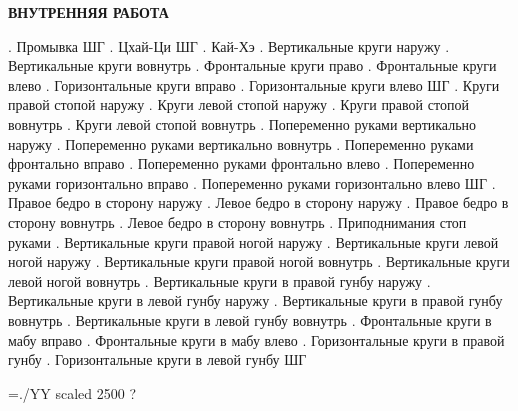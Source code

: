 \nopagenumbers
\centerline{\bf ВНУТРЕННЯЯ РАБОТА}
\obeylines
\leavevmode{}. Промывка
ШГ
\leavevmode{}. Цхай-Ци
ШГ
\leavevmode{}. Кай-Хэ
\leavevmode{}. Вертикальные круги наружу
\leavevmode{}. Вертикальные круги вовнутрь
\leavevmode{}. Фронтальные круги право
\leavevmode{}. Фронтальные круги влево
\leavevmode{}. Горизонтальные круги вправо
\leavevmode{}. Горизонтальные круги влево
ШГ
\leavevmode{}. Круги правой стопой наружу
\leavevmode{}. Круги левой стопой наружу
\leavevmode{}. Круги правой стопой вовнутрь
\leavevmode{}. Круги левой стопой вовнутрь
\leavevmode{}. Попеременно руками вертикально наружу
\leavevmode{}. Попеременно руками вертикально вовнутрь
\leavevmode{}. Попеременно руками фронтально вправо
\leavevmode{}. Попеременно руками фронтально влево
\leavevmode{}. Попеременно руками горизонтально вправо
\leavevmode{}. Попеременно руками горизонтально влево
ШГ
\leavevmode{}. Правое бедро в сторону наружу
\leavevmode{}. Левое бедро в сторону наружу
\leavevmode{}. Правое бедро в сторону вовнутрь
\leavevmode{}. Левое бедро в сторону вовнутрь
\leavevmode{}. Приподнимания стоп руками
\leavevmode{}. Вертикальные круги правой ногой наружу
\leavevmode{}. Вертикальные круги левой ногой наружу
\leavevmode{}. Вертикальные круги правой ногой вовнутрь
\leavevmode{}. Вертикальные круги левой ногой вовнутрь
\leavevmode{}. Вертикальные круги в правой гунбу наружу
\leavevmode{}. Вертикальные круги в левой гунбу наружу
\leavevmode{}. Вертикальные круги в правой гунбу вовнутрь
\leavevmode{}. Вертикальные круги в левой гунбу вовнутрь
\leavevmode{}. Фронтальные круги в мабу вправо
\leavevmode{}. Фронтальные круги в мабу влево
\leavevmode{}. Горизонтальные круги в правой гунбу
\leavevmode{}. Горизонтальные круги в левой гунбу
ШГ
\centerline{\font\YY=./YY scaled 2500 \YY?}
\bye
